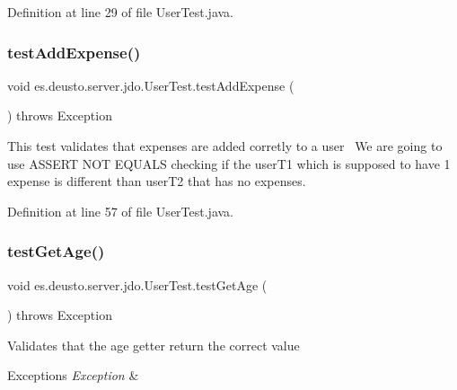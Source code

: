 Definition at line 29 of file User\+Test.\+java.

\mbox{\label{classes_1_1deusto_1_1server_1_1jdo_1_1_user_test_a60b10702d0f2d5b45895ce6bccd1d89e}} 
\subsubsection{\texorpdfstring{test\+Add\+Expense()}{testAddExpense()}}
{\footnotesize\ttfamily void es.\+deusto.\+server.\+jdo.\+User\+Test.\+test\+Add\+Expense (\begin{DoxyParamCaption}{ }\end{DoxyParamCaption}) throws Exception}

This test validates that expenses are added corretly to a user~\newline
We are going to use A\+S\+S\+E\+RT N\+OT E\+Q\+U\+A\+LS checking if the user\+T1 which is supposed to have 1 expense is different than user\+T2 that has no expenses. 

Definition at line 57 of file User\+Test.\+java.

\mbox{\label{classes_1_1deusto_1_1server_1_1jdo_1_1_user_test_a13dfa5e5c4795b59612fbea70ba5f3af}} 
\subsubsection{\texorpdfstring{test\+Get\+Age()}{testGetAge()}}
{\footnotesize\ttfamily void es.\+deusto.\+server.\+jdo.\+User\+Test.\+test\+Get\+Age (\begin{DoxyParamCaption}{ }\end{DoxyParamCaption}) throws Exception}

Validates that the age getter return the correct value 
\begin{DoxyExceptions}{Exceptions}
{\em Exception} & \\
\hline
\end{DoxyExceptions}


